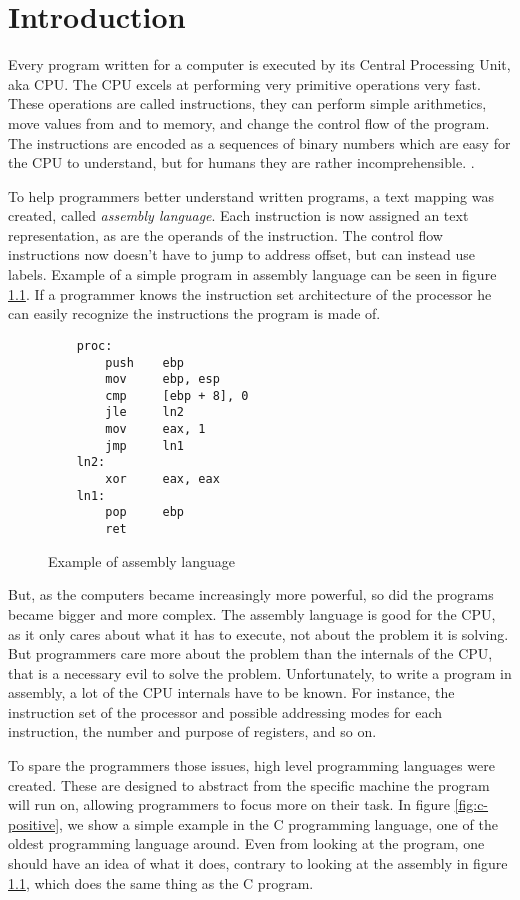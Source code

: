 \chapter{Introduction}
Every program written for a computer is executed by its Central Processing
Unit, aka CPU. The CPU excels at performing very primitive operations very
fast. These operations are called instructions, they can perform simple
arithmetics, move values from and to memory, and change the control flow of the
program. The instructions are encoded as a sequences of binary numbers which
are easy for the CPU to understand, but for humans they are rather
incomprehensible. .

To help programmers better understand written programs, a text mapping was
created, called \textit{assembly language}. Each instruction is now assigned an
text representation, as are the operands of the instruction. The control flow
instructions now doesn't have to jump to address offset, but can instead use
labels. Example of a simple program in assembly language can be seen in figure
\ref{fig:simple-assembly}. If a programmer knows the instruction set
architecture of the processor he can easily recognize the instructions the
program is made of.

\begin{figure}
    \begin{lstlisting}
    proc:
        push    ebp
        mov     ebp, esp
        cmp     [ebp + 8], 0
        jle     ln2
        mov     eax, 1
        jmp     ln1
    ln2:
        xor     eax, eax
    ln1:
        pop     ebp
        ret
    \end{lstlisting}
    \caption{Example of assembly language}
    \label{fig:simple-assembly}
\end{figure}

But, as the computers became increasingly more powerful, so did the programs
became bigger and more complex. The assembly language is good for the CPU, as
it only cares about what it has to execute, not about the problem it is
solving. But programmers care more about the problem than the internals of the
CPU, that is a necessary evil to solve the problem. Unfortunately, to write a
program in assembly, a lot of the CPU internals have to be known. For instance,
the instruction set of the processor and possible addressing modes for each
instruction, the number and purpose of registers, and so on.

To spare the programmers those issues, high level programming languages were
created. These are designed to abstract from the specific machine the program
will run on, allowing programmers to focus more on their task. In figure
\ref{fig:c-positive}, we show a simple example in the C programming language,
one of the oldest programming language around. Even from looking at the
program, one should have an idea of what it does, contrary to looking at
the assembly in figure \ref{fig:simple-assembly}, which does the same thing
as the C program.

